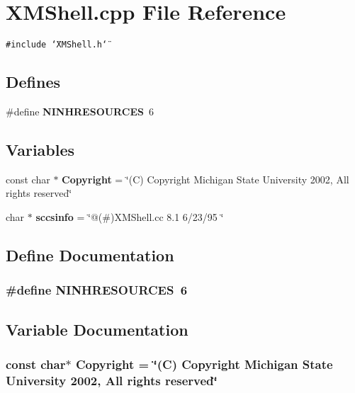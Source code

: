 \section{XMShell.cpp File Reference}
\label{XMShell_8cpp}
{\tt \#include \char`\"{}XMShell.h\char`\"{}}\par
\subsection*{Defines}
\begin{CompactItemize}
\item 
\#define {\bf NINHRESOURCES}\ 6
\end{CompactItemize}
\subsection*{Variables}
\begin{CompactItemize}
\item 
const char $\ast$ {\bf Copyright} = \char`\"{}(C) Copyright Michigan State University 2002, All rights reserved\char`\"{}
\item 
char $\ast$ {\bf sccsinfo} = \char`\"{}@(\#)XMShell.cc 8.1 6/23/95 \char`\"{}
\end{CompactItemize}


\subsection{Define Documentation}
\subsubsection{\setlength{\rightskip}{0pt plus 5cm}\#define NINHRESOURCES\ 6}\label{XMShell_8cpp_a0}




\subsection{Variable Documentation}
\subsubsection{\setlength{\rightskip}{0pt plus 5cm}const char$\ast$ Copyright = \char`\"{}(C) Copyright Michigan State University 2002, All rights reserved\char`\"{}\hspace{0.3cm}{\tt  [static]}}\label{XMShell_8cpp_a1}




